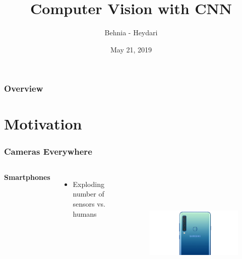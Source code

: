 \documentclass{beamer}
\title[CNNs]{Computer Vision with CNN}
\author{Behnia - Heydari}
\institute[AUT]
{
Amirkabir University of Technology \\ 
\medskip
\textit{}
}
\date{May 21, 2019}
\begin{document}
\begin{frame}
\titlepage
\end{frame}

\begin{frame}
\frametitle{Overview}
\tableofcontents
\end{frame}

\section{Motivation}

\begin{frame}
\frametitle{Cameras Everywhere}
\begin{columns}[c]

\textbf{Smartphones}
\begin{itemize}
\item Exploding number of sensors vs. humans

\end{itemize}

\begin{figure}
	\includegraphics[height=180pt]{Pics/samsung.jpg}
\end{figure}
\end{columns}
\end{frame}
\end{document}
